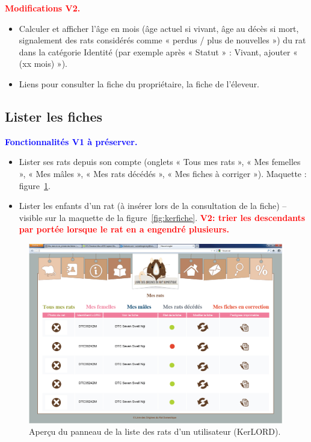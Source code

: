 \documentclass[a4paper,10pt]{article}
\newcommand\existant[1]{\noindent\textbf{\textcolor{blue}{#1}}}
\newcommand\desire[1]{\noindent\textbf{\textcolor{red}{#1}}}
\begin{document}
\desire{Modifications V2.}
\begin{itemize}
\item Calculer et afficher l'âge en mois (âge actuel si vivant, âge au décès si mort, signalement des rats considérés comme « perdus / plus de nouvelles ») du rat dans la catégorie Identité (par exemple après « Statut » : Vivant, ajouter « (xx mois) »).  
\item Liens pour consulter la fiche du propriétaire, la fiche de l'éleveur.
\end{itemize}

\subsection{Lister les fiches}
\existant{Fonctionnalités V1 à préserver.}
\begin{itemize}
\item Lister ses rats depuis son compte (onglets « Tous mes rats », « Mes femelles », « Mes mâles », « Mes rats décédés », « Mes fiches à corriger »). Maquette : figure~\ref{fig:kerdashuser}.   
\item Lister les enfants d'un rat (à insérer lors de la consultation de la fiche)  -- visible sur la maquette de la figure~\ref{fig:kerfiche}. \desire{V2: trier les descendants par portée lorsque le rat en a engendré plusieurs.}
\end{itemize}

\begin{figure}[htbp!]
\begin{center}\includegraphics[width=0.8\linewidth]{DashboardUser.jpg}\end{center}
\caption{Aperçu du panneau de la liste des rats d'un utilisateur (KerLORD).\label{fig:kerdashuser}}
\end{figure}
\end{document}
